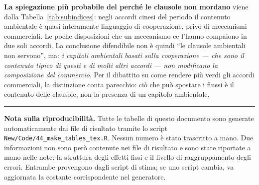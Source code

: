 \documentclass[11pt,a4paper]{article}
\begin{document}
\textbf{La spiegazione pi\`u probabile del perch\'e le clausole non mordano} viene dalla
Tabella~\ref{tab:subindices}: negli accordi cinesi del periodo il contenuto ambientale \`e
quasi interamente linguaggio di cooperazione, privo di meccanismi commerciali. Le poche
disposizioni che un meccanismo ce l'hanno compaiono in due soli accordi. La conclusione
difendibile non \`e quindi ``le clausole ambientali non servono'', ma: \emph{i capitoli
ambientali basati sulla cooperazione --- che sono il contenuto tipico di questi e di molti
altri accordi --- non modificano la composizione del commercio}. Per il dibattito su come
rendere pi\`u verdi gli accordi commerciali, la distinzione conta parecchio: ci\`o che pu\`o
spostare i flussi \`e il contenuto delle clausole, non la presenza di un capitolo
ambientale.

\vspace{1em}
\hrule
\vspace{0.6em}

\small
\textbf{Nota sulla riproducibilit\`a.} Tutte le tabelle di questo documento sono generate
automaticamente dai file di risultato tramite lo script \texttt{New/Code/44\_make\_tables\_tex.R}.
Nessun numero \`e stato trascritto a mano. Due informazioni non sono per\`o contenute nei
file di risultato e sono state riportate a mano nelle note: la struttura degli effetti fissi
e il livello di raggruppamento degli errori. Entrambe provengono dagli script di stima; se
uno script cambia, va aggiornata la costante corrispondente nel generatore.
\end{document}
